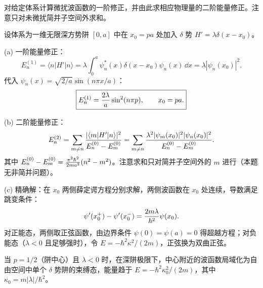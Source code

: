 \begin{question}
对给定体系计算微扰波函数的一阶修正，并由此求相应物理量的二阶能量修正。注意只对未微扰简并子空间外求和。
\end{question}
\begin{solution}
设体系为一维无限深方势阱 $[0,a]$ 中在 $x_0=pa$ 处加入 $\delta$ 势 $H'=\lambda\delta(x-x_0)$。

(a) 一阶能量修正：
\[
E_n^{(1)} = \langle n|H'|n\rangle = \lambda\int_0^a \psi_n^*(x)\delta(x-x_0)\psi_n(x)\,\dd x = \lambda|\psi_n(x_0)|^2.
\]
代入 $\psi_n(x)=\sqrt{2/a}\sin(n\pi x/a)$：
\[
\boxed{E_n^{(1)} = {2\lambda\over a}\sin^2(n\pi p),\qquad x_0=pa.}
\]

(b) 二阶能量修正：
\[
E_n^{(2)} = \sum_{m\ne n} {|\langle m|H'|n\rangle|^2\over E_n^{(0)}-E_m^{(0)}}
= \sum_{m\ne n} {\lambda^2 |\psi_m(x_0)|^2|\psi_n(x_0)|^2\over E_n^{(0)}-E_m^{(0)}}.
\]
其中 $E_n^{(0)}-E_m^{(0)} = {\pi^2\hbar^2\over2ma^2}(n^2-m^2)$。注意求和只对简并子空间外的 $m$ 进行（本题无非简并问题）。

(c) 精确解：在 $x_0$ 两侧薛定谔方程分别求解，两侧波函数在 $x_0$ 处连续，导数满足跳变条件：
\[
\psi'(x_0^+)-\psi'(x_0^-) = {2m\lambda\over\hbar^2}\psi(x_0).
\]
对正能态，两侧取正弦函数，由边界条件 $\psi(0)=\psi(a)=0$ 得超越方程；对负能态（$\lambda<0$ 且足够强时），令 $E=-\hbar^2\kappa^2/(2m)$，正弦换为双曲正弦。

当 $p=1/2$（阱中心）且 $\lambda<0$ 时，在深阱极限下，中心附近的波函数局域化为自由空间中单个 $\delta$ 势阱的束缚态，能量趋于 $E=-\hbar^2\kappa_0^2/(2m)$，其中 $\kappa_0 = m|\lambda|/\hbar^2$。
\end{solution}

